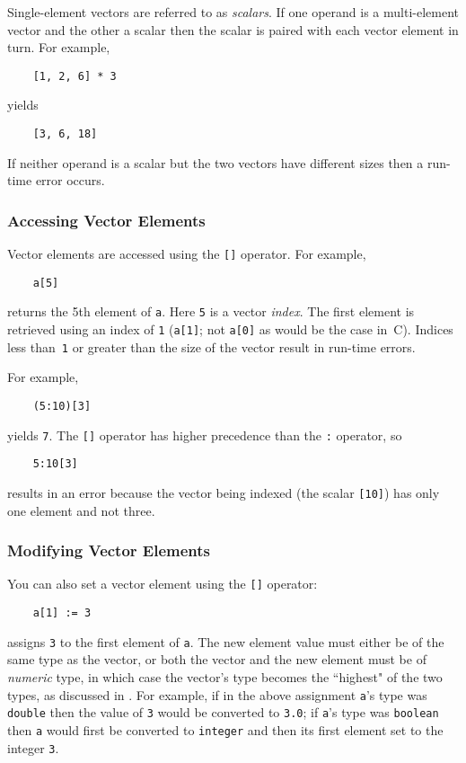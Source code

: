Single-element vectors are referred to as {\em scalars\/}.
If one operand
is a multi-element vector and the other a scalar then
the scalar is paired with each vector element in turn.  For example,
\begin{verbatim}
    [1, 2, 6] * 3
\end{verbatim}
yields
\begin{verbatim}
    [3, 6, 18]
\end{verbatim}
If neither operand
is a scalar but the two vectors have different sizes
then a run-time error occurs.

\subsubsection{Accessing Vector Elements}
\label{vector-access}

Vector elements
are accessed using the {\tt []} operator.  For example,
\begin{verbatim}
    a[5]
\end{verbatim}
returns the 5th element of {\tt a}.  Here {\tt 5} is a vector {\em index\/}.
The first element
is retrieved using an index of {\tt 1} ({\tt a[1]}; not
{\tt a[0]} as would be the case in~C).  Indices less than~{\tt 1}
or greater than the size of the vector result in run-time errors.

For example,
\begin{verbatim}
    (5:10)[3]
\end{verbatim}
yields {\tt 7}.  The {\tt []} operator has higher precedence than the
{\tt :} operator, so
\begin{verbatim}
    5:10[3]
\end{verbatim}
results in an error because the vector being indexed (the scalar {\tt [10]})
has only one element and not three.

\subsubsection{Modifying Vector Elements}
\label{vector-mod}

You can also
set a vector element using the {\tt []} operator:
\begin{verbatim}
    a[1] := 3
\end{verbatim}
assigns {\tt 3} to the first element of {\tt a}.  The new element value
must either be of the same type as the vector, or both the vector and the new
element must be of {\em numeric} type, in
which case the vector's type becomes the
``highest" of the two types, as discussed in .
For example, if in the above assignment {\tt a}'s type was {\tt double} then 
the value of {\tt 3} would be converted to {\tt 3.0}; if {\tt a}'s type
was {\tt boolean} then {\tt a} would first be converted to {\tt integer}
and then its first element set to the integer {\tt 3}.

